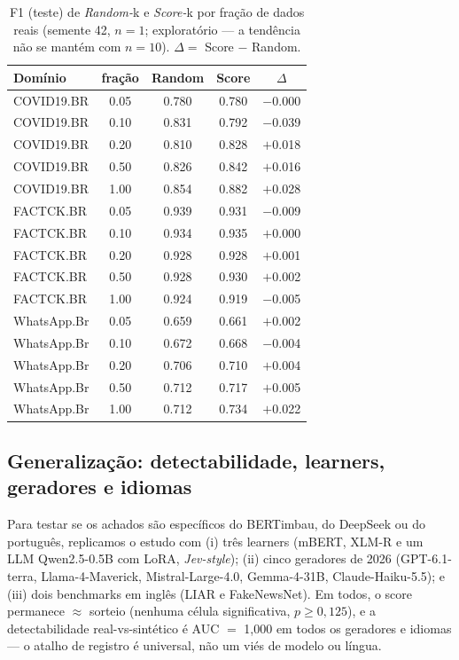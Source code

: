 \documentclass[conference]{IEEEtran}
\begin{document}
\begin{table}[!t]
\caption{F1 (teste) de \emph{Random-}k e \emph{Score-}k por fra\c{c}\~ao de dados reais (semente 42, $n{=}1$; explorat\'orio --- a tend\^encia n\~ao se mant\'em com $n{=}10$). $\Delta = $ Score $-$ Random.}\label{tab:competence}
\centering
\footnotesize
\setlength{\tabcolsep}{4pt}
\begin{tabular}{@{}lcccc@{}}
\toprule
Dom\'inio & fra\c{c}\~ao & Random & Score & $\Delta$ \\
\midrule
COVID19.BR & 0.05 & 0.780 & 0.780 & $-$0.000 \\
COVID19.BR & 0.10 & 0.831 & 0.792 & $-$0.039 \\
COVID19.BR & 0.20 & 0.810 & 0.828 & $+$0.018 \\
COVID19.BR & 0.50 & 0.826 & 0.842 & $+$0.016 \\
COVID19.BR & 1.00 & 0.854 & 0.882 & $+$0.028 \\
FACTCK.BR & 0.05 & 0.939 & 0.931 & $-$0.009 \\
FACTCK.BR & 0.10 & 0.934 & 0.935 & $+$0.000 \\
FACTCK.BR & 0.20 & 0.928 & 0.928 & $+$0.001 \\
FACTCK.BR & 0.50 & 0.928 & 0.930 & $+$0.002 \\
FACTCK.BR & 1.00 & 0.924 & 0.919 & $-$0.005 \\
WhatsApp.Br & 0.05 & 0.659 & 0.661 & $+$0.002 \\
WhatsApp.Br & 0.10 & 0.672 & 0.668 & $-$0.004 \\
WhatsApp.Br & 0.20 & 0.706 & 0.710 & $+$0.004 \\
WhatsApp.Br & 0.50 & 0.712 & 0.717 & $+$0.005 \\
WhatsApp.Br & 1.00 & 0.712 & 0.734 & $+$0.022 \\
\bottomrule
\end{tabular}
\end{table}

\subsection{Generaliza\c{c}\~ao: detectabilidade, learners, geradores e idiomas}

Para testar se os achados s\~ao espec\'ificos do BERTimbau, do DeepSeek ou do portugu\^es, replicamos o estudo com (i) tr\^es learners (mBERT, XLM-R e um LLM Qwen2.5-0.5B com LoRA, \emph{Jev-style}); (ii) cinco geradores de 2026 (GPT-6.1-terra, Llama-4-Maverick, Mistral-Large-4.0, Gemma-4-31B, Claude-Haiku-5.5); e (iii) dois benchmarks em ingl\^es (LIAR e FakeNewsNet). Em todos, o score permanece $\approx$ sorteio (nenhuma c\'elula significativa, $p\ge 0{,}125$), e a detectabilidade real-vs-sint\'etico \'e AUC $=$ 1{,}000 em todos os geradores e idiomas --- o atalho de registro \'e universal, n\~ao um vi\'es de modelo ou l\'ingua.
\end{document}
